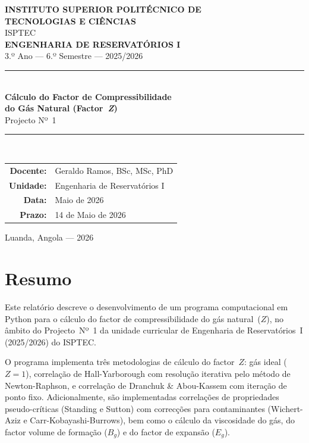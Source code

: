 \documentclass[12pt,a4paper]{article}
\begin{document}
\thispagestyle{empty}

\begin{center}
  {\Large\bfseries INSTITUTO SUPERIOR POLITÉCNICO DE\\[4pt]
  TECNOLOGIAS E CIÊNCIAS}\\[6pt]
  {\large ISPTEC}\\[1.5cm]

  {\large\bfseries ENGENHARIA DE RESERVATÓRIOS I}\\[4pt]
  {\normalsize 3.º Ano — 6.º Semestre — 2025/2026}\\[2cm]

  \rule{\linewidth}{1pt}\\[0.4cm]
  {\LARGE\bfseries Cálculo do Factor de Compressibilidade\\[6pt]
  do Gás Natural (Factor~\textit{Z})}\\[0.3cm]
  {\large Projecto Nº~1}\\[0.2cm]
  \rule{\linewidth}{1pt}\\[2cm]

  {\normalsize
  \begin{tabular}{rl}
    \textbf{Docente:}  & Geraldo Ramos, BSc, MSc, PhD \\[4pt]
    \textbf{Unidade:}  & Engenharia de Reservatórios I \\[4pt]
    \textbf{Data:}     & Maio de 2026 \\[4pt]
    \textbf{Prazo:}    & 14 de Maio de 2026 \\
  \end{tabular}}

  \vfill
  {\small Luanda, Angola — 2026}
\end{center}

\newpage
{}
\setcounter{page}{1}

\section*{Resumo}

Este relatório descreve o desenvolvimento de um programa computacional em Python
para o cálculo do factor de compressibilidade do gás natural~($Z$), no âmbito
do Projecto~Nº~1 da unidade curricular de Engenharia de Reservatórios~I
(2025/2026) do ISPTEC.

O programa implementa três metodologias de cálculo do factor~$Z$: gás ideal
($Z=1$), correlação de Hall-Yarborough com resolução iterativa pelo método de
Newton-Raphson, e correlação de Dranchuk \& Abou-Kassem com iteração de ponto
fixo. Adicionalmente, são implementadas correlações de propriedades
pseudo-críticas (Standing e Sutton) com correcções para contaminantes
(Wichert-Aziz e Carr-Kobayashi-Burrows), bem como o cálculo da viscosidade do
gás, do factor volume de formação ($B_g$) e do factor de expansão ($E_g$).
\end{document}

